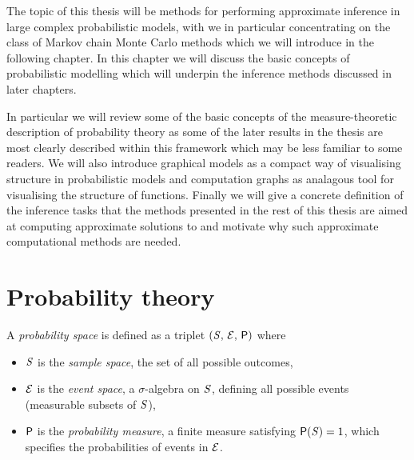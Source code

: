 The topic of this thesis will be methods for performing approximate inference in large complex probabilistic models, with we in particular concentrating on the class of Markov chain Monte Carlo methods which we will introduce in the following chapter. In this chapter we will discuss the basic concepts of probabilistic modelling which will underpin the inference methods discussed in later chapters. 

In particular we will review some of the basic concepts of the measure-theoretic description of probability theory as some of the later results in the thesis are most clearly described within this framework which may be less familiar to some readers. We will also introduce graphical models as a compact way of visualising structure in probabilistic models and computation graphs as analagous tool for visualising the structure of functions. Finally we will give a concrete definition of the inference tasks that the methods presented in the rest of this thesis are aimed at computing approximate solutions to and motivate why such approximate computational methods are needed.


\newpage 
\section{Probability theory}\label{sec:probability-theory}

A \emph{probability space} is defined as a triplet $(\mathit{S},\,\mathcal{E},\,\mathsf{P})$ where

\begin{itemize}
  \item $\mathit{S}$ is the \emph{sample space}, the set of all possible outcomes,
  \item $\mathcal{E}$ is the \emph{event space}, a $\sigma$-algebra on $\mathit{S}$, defining all possible events (measurable subsets of $\mathit{S}$),
  \item $\mathsf{P}$ is the \emph{probability measure}, a finite measure satisfying $\mathsf{P}(\mathit{S}) = 1$, which specifies the probabilities of events in $\mathcal{E}$.
\end{itemize}

